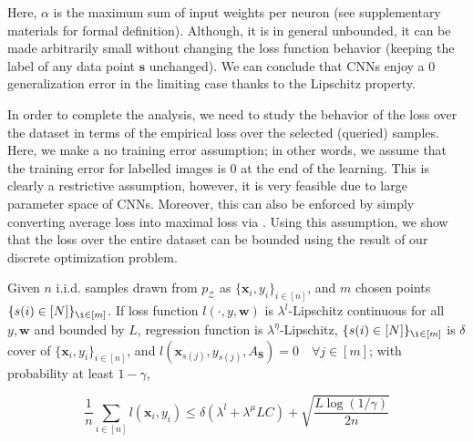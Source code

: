 Here, $\alpha$ is the maximum sum of  input weights per neuron (see supplementary materials for formal definition). Although, it is in general unbounded, it can be made arbitrarily small without changing the loss function behavior (\ie keeping the label of any data point $\mathbf{s}$ unchanged). %
We can conclude that CNNs enjoy a $0$ generalization error in the limiting case thanks to the Lipschitz property.

In order to complete the analysis, we need to study the behavior of the loss over the dataset in terms of the empirical loss over the selected (queried) samples. Here, we make a no training error assumption; in other words, we assume that the training error for labelled images is $0$ at the end of the learning. This is clearly a restrictive assumption, however, it is very feasible due to large parameter space of CNNs. Moreover, this can also be enforced by simply converting average loss into maximal loss via \cite{maximal_loss}. %
Using this assumption, we show that the loss over the entire dataset can be bounded using the result of our discrete optimization problem.%

\begin{theorem}
Given $n$ i.i.d. samples drawn from $p_\mathcal{Z}$ as $\{\mathbf{x}_i,y_i\}_{i\in[n]}$, and $m$ chosen points $\{ s(i) \in [N]\}_{\i \in [m]}$. If loss function $l(\cdot,y,\mathbf{w})$ is $\lambda^l$-Lipschitz continuous for all $y, \mathbf{w}$ and bounded by $L$, regression function is $\lambda^\eta$-Lipschitz, $\{ s(i) \in [N]\}_{\i \in [m]}$ is $\delta$ cover of $\{\mathbf{x}_i,y_i\}_{i\in[n]}$, and $l(\mathbf{x}_{s(j)},y_{s(j)},A_\mathbf{S})=0\quad \forall j \in [m]$; with probability at least $1-\gamma$,
\begin{small}
\[
\frac{1}{n}\sum_{i \in [n]} l(\mathbf{x}_i,y_i) \leq \delta (\lambda^l + \lambda^\mu LC)+ 
\sqrt{\frac{L \log(1/\gamma)}{2n}}
\]
\end{small}
\label{mainthm2}
\end{theorem}

